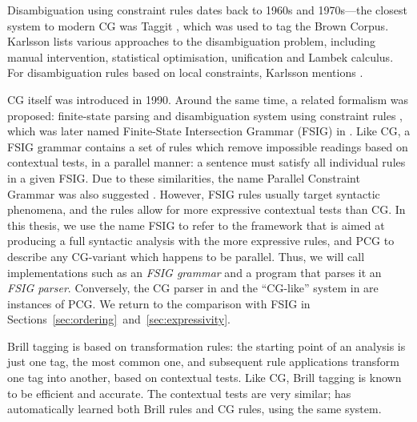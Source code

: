 Disambiguation using constraint rules dates back to 1960s and 1970s---the closest system to modern CG was Taggit \cite{taggit}, which was used to tag the Brown Corpus.
Karlsson \cite{karlsson1995constraint} lists various approaches to the disambiguation 
problem, including manual intervention, statistical optimisation, unification and Lambek calculus. 
For disambiguation rules based on local constraints, Karlsson mentions \cite{hindle1989disamrules,herz1991local}.


CG itself was introduced in 1990. Around the same time, a related formalism was proposed: 
finite-state parsing and disambiguation system using constraint rules \cite{koskenniemi90}, which was later named Finite-State Intersection Grammar (FSIG) in \cite{piitulainen1995}. 
Like CG, a FSIG grammar contains a set of rules which remove impossible readings based on contextual tests, 
in a parallel manner: a sentence must satisfy all individual rules in a given FSIG. 
Due to these similarities, the name Parallel Constraint Grammar was also suggested \cite{koskenniemi97}.
However, FSIG rules usually target syntactic phenomena, and the rules allow for more expressive contextual tests than CG. 
In this thesis, we use the name FSIG to refer to the framework that is aimed at producing a full syntactic analysis with the more expressive rules, 
and PCG to describe any CG-variant which happens to be parallel.
Thus, we will call implementations such as \cite{voutilainen1994designing} an \emph{FSIG grammar} and a program that parses it an \emph{FSIG parser}.
Conversely, the CG parser in \cite{listenmaa_claessen2015} 
and the ``CG-like'' system in \cite{lager98} are instances of PCG.
We return to the comparison with FSIG in Sections~\ref{sec:ordering}~and~\ref{sec:expressivity}.


Brill tagging \cite{brill1995} is based on transformation rules: the starting point of 
an analysis is just one tag, the most common one, and subsequent rule applications transform 
one tag into another, based on contextual tests. 
Like CG, Brill tagging is known to be efficient and accurate. The contextual tests are very similar; \cite{lager01transformation} 
has automatically learned both Brill rules and CG rules, using the same system.

